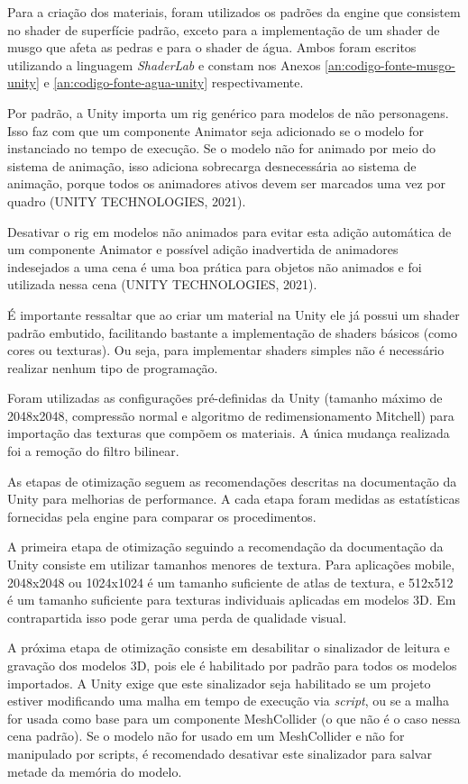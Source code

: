 Para a criação dos materiais, foram utilizados os padrões da engine que consistem no shader de superfície padrão, exceto para a implementação de um shader de musgo que afeta as pedras e para o shader de água. Ambos foram escritos utilizando a linguagem \textit{ShaderLab} e constam nos Anexos \ref{an:codigo-fonte-musgo-unity} e \ref{an:codigo-fonte-agua-unity} respectivamente.

Por padrão, a Unity importa um rig genérico para modelos de não personagens. Isso faz com que um componente Animator seja adicionado se o modelo for instanciado no tempo de execução. Se o modelo não for animado por meio do sistema de animação, isso adiciona sobrecarga desnecessária ao sistema de animação, porque todos os animadores ativos devem ser marcados uma vez por quadro (UNITY TECHNOLOGIES, 2021)\nocite{unityTech2021}.

Desativar o rig em modelos não animados para evitar esta adição automática de um componente Animator e possível adição inadvertida de animadores indesejados a uma cena é uma boa prática para objetos não animados e foi utilizada nessa cena (UNITY TECHNOLOGIES, 2021). 

É importante ressaltar que ao criar um material na Unity ele já possui um shader padrão embutido, facilitando bastante a implementação de shaders básicos (como cores ou texturas). Ou seja, para implementar shaders simples não é necessário realizar nenhum tipo de programação.

Foram utilizadas as configurações pré-definidas da Unity (tamanho máximo de 2048x2048, compressão normal e algoritmo de redimensionamento Mitchell) para importação das texturas que compõem os materiais. A única mudança realizada foi a remoção do filtro bilinear.

As etapas de otimização seguem as recomendações descritas na documentação da Unity para melhorias de performance. A cada etapa foram medidas as estatísticas fornecidas pela engine para comparar os procedimentos.

A primeira etapa de otimização seguindo a recomendação da documentação da Unity consiste em utilizar tamanhos menores de textura. Para aplicações mobile, 2048x2048 ou 1024x1024 é um tamanho suficiente de atlas de textura, e 512x512 é um tamanho suficiente para texturas individuais aplicadas em modelos 3D. Em contrapartida isso pode gerar uma perda de qualidade visual.

A próxima etapa de otimização consiste em desabilitar o sinalizador de leitura e gravação dos modelos 3D, pois ele é habilitado por padrão para todos os modelos importados. A Unity exige que este sinalizador seja habilitado se um projeto estiver modificando uma malha em tempo de execução via \textit{script}, ou se a malha for usada como base para um componente MeshCollider (o que não é o caso nessa cena padrão). Se o modelo não for usado em um MeshCollider e não for manipulado por scripts, é recomendado desativar este sinalizador para salvar metade da memória do modelo.

